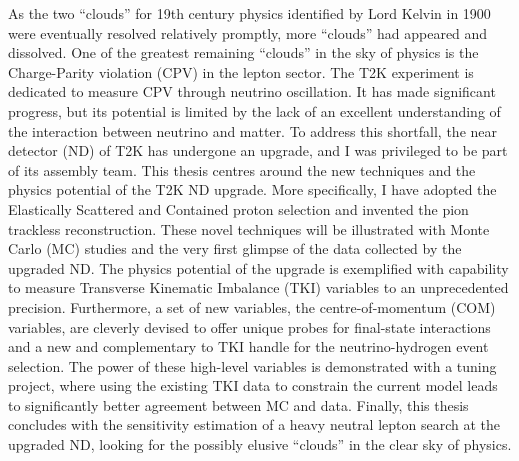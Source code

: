 As the two ``clouds'' for 19th century physics identified by Lord Kelvin in 1900 were eventually resolved relatively promptly, more ``clouds'' had appeared and dissolved.
One of the greatest remaining ``clouds'' in the sky of physics is the Charge-Parity violation (CPV) in the lepton sector.
The T2K experiment is dedicated to measure CPV through neutrino oscillation.
It has made significant progress, but its potential is limited by the lack of an excellent understanding of the interaction between neutrino and matter.
To address this shortfall, the near detector (ND) of T2K has undergone an upgrade, and I was privileged to be part of its assembly team.
This thesis centres around the new techniques and the physics potential of the T2K ND upgrade.
More specifically, I have adopted the Elastically Scattered and Contained proton selection and invented the pion trackless reconstruction.
These novel techniques will be illustrated with Monte Carlo (MC) studies and the very first glimpse of the data collected by the upgraded ND.
The physics potential of the upgrade is exemplified with capability to measure Transverse Kinematic Imbalance (TKI) variables to an unprecedented precision.
Furthermore, a set of new variables, the centre-of-momentum (COM) variables, are cleverly devised to offer unique probes for final-state interactions and a new and complementary to TKI handle for the neutrino-hydrogen event selection.
The power of these high-level variables is demonstrated with a tuning project, where using the existing TKI data to constrain the current model leads to significantly better agreement between MC and data.
Finally, this thesis concludes with the sensitivity estimation of a heavy neutral lepton search at the upgraded ND, looking for the possibly elusive ``clouds'' in the clear sky of physics.